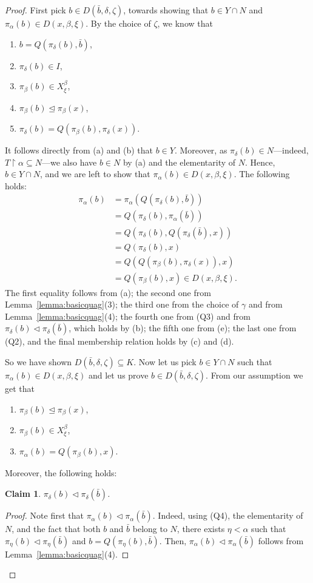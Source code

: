\documentclass[10pt,a4paper]{amsart}
\newtheorem{subclaim}{Claim}
\begin{document}
\begin{proof}
First pick $b \in D(\bar{b}, \delta, \zeta)$, towards showing that $b \in Y \cap N$ and $\pi_\alpha(b) \in D(x, \beta, \xi)$. By the choice of $\zeta$, we know that
\begin{enumerate}[label=(\alph*)]
\item $b = Q(\pi_\delta(b), \bar{b})$,
\item $\pi_\delta(b) \in I$,
\item $\pi_\beta(b) \in X^\beta_\xi$,
\item $\pi_\beta(b) \trianglelefteq \pi_\beta(x)$,
\item $\pi_\delta(b) = Q(\pi_\beta(b), \pi_\delta(x))$.
\end{enumerate}
It follows directly from (a) and (b) that $b \in Y$. Moreover, as $\pi_\delta(b) \in N$---indeed, $T \upharpoonright \alpha \subseteq N$---we also have $b \in N$ by (a) and the elementarity of $N$. Hence, $b \in Y \cap N$, and we are left to show that $\pi_\alpha(b) \in D(x, \beta, \xi)$. The following holds:
\begin{align*}
\pi_\alpha(b) &= \pi_\alpha(Q(\pi_\delta(b), \bar{b}))\\&= Q(\pi_\delta(b), \pi_\alpha(\bar{b}))\\&= Q(\pi_\delta(b), Q(\pi_\delta(\bar{b}), x)) \\&= Q(\pi_\delta(b), x) \\&= Q(Q(\pi_\beta(b), \pi_\delta(x)), x) \\&= Q(\pi_\beta(b), x) \in D(x, \beta, \xi).
\end{align*} 
The first equality follows from (a); the second one from Lemma~\ref{lemma:basicquag}(3); the third one from the choice of $\gamma$ and from Lemma~\ref{lemma:basicquag}(4); the fourth one from (Q3) and from $\pi_\delta(b) \lhd \pi_\delta(\bar{b})$, which holds by (b); the fifth one from (e); the last one from (Q2), and the final membership relation holds by (c) and (d).

So we have shown $D(\bar{b}, \delta, \zeta) \subseteq K$. Now let us pick $b \in Y \cap N$ such that $\pi_\alpha(b) \in D(x, \beta, \xi)$ and let us prove $b \in D(\bar{b}, \delta, \zeta)$. From our assumption we get that 
\begin{enumerate}[label=(\roman*)]
\item $\pi_\beta(b) \trianglelefteq \pi_\beta(x)$,
\item $\pi_\beta(b) \in X^\beta_\xi$,
\item $\pi_\alpha(b) = Q(\pi_\beta(b), x)$.
\end{enumerate}
Moreover, the following holds:
\begin{subclaim}\label{claim:5-1}
$\pi_\delta(b) \lhd \pi_\delta(\bar{b})$.
\end{subclaim}
\begin{proof}
Note first that $\pi_\alpha(b) \lhd \pi_\alpha(\bar{b})$. Indeed, using (Q4), the elementarity of $N$, and the fact that both $b$ and $\bar{b}$ belong to $N$, there exists $\eta < \alpha$ such that $\pi_\eta(b) \lhd \pi_\eta(\bar{b})$ and $b = Q(\pi_\eta(b), \bar{b})$. Then, $\pi_\alpha(b) \lhd \pi_\alpha(\bar{b})$ follows from Lemma~\ref{lemma:basicquag}(4). 


\end{proof}
\end{proof}
\end{document}
